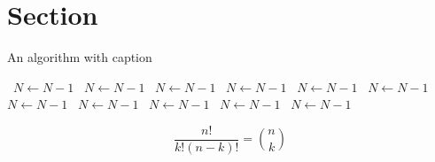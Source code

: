 \documentclass[a4paper]{article}
\begin{document}
\section{Section}

\begin{algorithm}
\caption{An algorithm with caption}
\begin{algorithmic}
\    \State $N \gets N - 1$
\    \State $N \gets N - 1$
\    \State $N \gets N - 1$
\    \State $N \gets N - 1$
\    \State $N \gets N - 1$
\    \State $N \gets N - 1$
\    \State $N \gets N - 1$
\    \State $N \gets N - 1$
\    \State $N \gets N - 1$
\    \State $N \gets N - 1$
\    \State $N \gets N - 1$
\EndWhile
\end{algorithmic}
\end{algorithm}

\[ \frac{n!}{k!(n-k)!} = \binom{n}{k} \]
\end{document}
